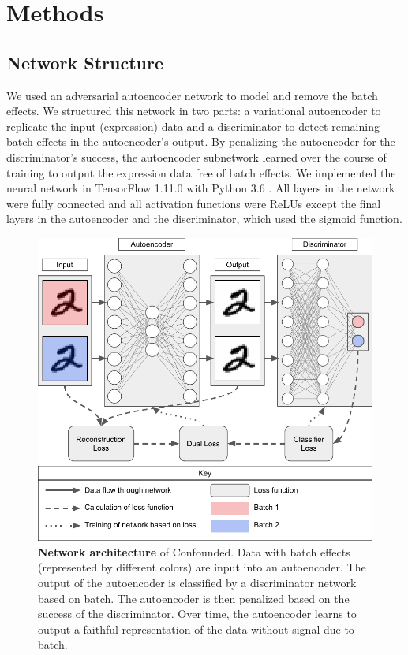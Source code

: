 \documentclass[notitlepage]{article}
\begin{document}
\section{Methods} \label{sec:methods}

\subsection{Network Structure}

We used an adversarial autoencoder network to model and remove the batch effects.
We structured this network in two parts: a variational autoencoder \cite{louizos_variational_2015} to replicate the input (expression) data and a discriminator to detect remaining batch effects in the autoencoder's output.
By penalizing the autoencoder for the discriminator's success, the autoencoder subnetwork learned over the course of training to output the expression data free of batch effects.
We implemented the neural network in TensorFlow 1.11.0 \cite{abadi_tensorflow_2015} with Python 3.6 \cite{python_software_foundation_python_2019}.
All layers in the network were fully connected and all activation functions were ReLUs \cite{agarap_deep_2018} except the final layers in the autoencoder and the discriminator, which used the sigmoid function.

\begin{figure}
	\centering
	\includegraphics[width=\columnwidth]{figures/final/network.pdf}
	\caption{\textbf{Network architecture} of Confounded.
	Data with batch effects (represented by different colors) are input into an autoencoder.
	The output of the autoencoder is classified by a discriminator network based on batch.
	The autoencoder is then penalized based on the success of the discriminator.
	Over time, the autoencoder learns to output a faithful representation of the data without signal due to batch.}
	\label{fig:network}
\end{figure}
\end{document}
